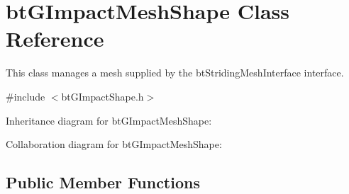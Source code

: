 \hypertarget{classbt_g_impact_mesh_shape}{\section{bt\+G\+Impact\+Mesh\+Shape Class Reference}
\label{classbt_g_impact_mesh_shape}
}


This class manages a mesh supplied by the bt\+Striding\+Mesh\+Interface interface.  




{\ttfamily \#include $<$bt\+G\+Impact\+Shape.\+h$>$}



Inheritance diagram for bt\+G\+Impact\+Mesh\+Shape\+:


Collaboration diagram for bt\+G\+Impact\+Mesh\+Shape\+:
\subsection*{Public Member Functions}
